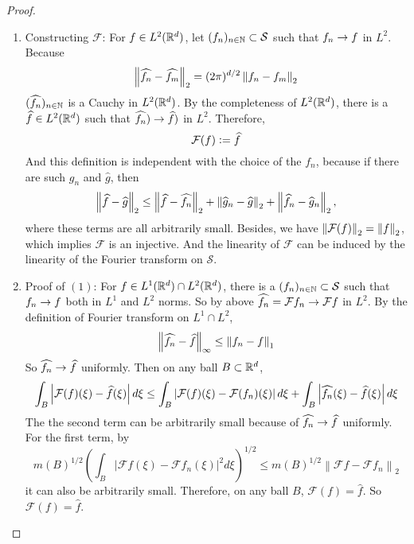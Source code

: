 \begin{enumerate}[label=\arabic*.]
\begin{proof}
\begin{enumerate}[label=\Roman*.]
			\item Constructing $\mathcal{F}$: For $f \in L^2(\mathbb{R}^d)$, let $(f_n)_{n \in \mathbb{N}} \subset \mathcal{S}$ such that $f_n \rightarrow f$ in $L^2$. Because
			\begin{equation*}
				\left\lVert\widehat{f_n} - \widehat{f_m}\right\lVert_2 = (2 \pi)^{d/2}\left\lVert{f_n} - {f_m}\right\lVert_2
			\end{equation*}
			$(\widehat{f_n})_{n \in \mathbb{N}}$ is a Cauchy in $L^2(\mathbb{R}^d)$. By the completeness of $L^2(\mathbb{R}^d)$, there is a $\widehat{f} \in L^2(\mathbb{R}^d)$ such that $\widehat{f_n}) \rightarrow \widehat{f})$ in $L^2$. Therefore, 
			\begin{equation*}
				\mathcal{F}(f) \vcentcolon= \widehat{f}
			\end{equation*}
			And this definition is independent with the choice of the $f_n$, because if there are such $g_n$ and $\widehat{g}$, then
			\begin{equation*}
				\left\lVert\widehat{f}-\widehat{g}\right\lVert_2 \leq \left\lVert\widehat{f}-\widehat{f_n}\right\lVert_2 + \left\lVert\widehat{g}_n-\widehat{g}\right\lVert_2+ \left\lVert\widehat{f}_n-\widehat{g}_n\right\lVert_2,
			\end{equation*}
			where these terms are all arbitrarily small. Besides, we have $\left\lVert\mathcal{F}(f)\right\lVert_2 = \left\lVert f\right\lVert_2$, which implies $\mathcal{F}$ is an injective. And the linearity of $\mathcal{F}$ can be induced by the linearity of the Fourier transform on $\mathcal{S}$.

			\item Proof of $(1)$: For $f \in L^1(\mathbb{R}^d) \cap L^2(\mathbb{R}^d)$, there is a $(f_n)_{n \in \mathbb{N}} \subset \mathcal{S}$ such that $f_n \rightarrow f$ both in $L^1$ and $L^2$ norms. So by above $\widehat{f_n} = \mathcal{F}f_n \rightarrow \mathcal{F}f$ in $L^2$. By the definition of Fourier transform on $L^1\cap L^2$,
			\begin{equation*}
				\left\lVert\widehat{f_n} - \widehat{f}\right\lVert_\infty \leq \left\lVert f_n-f\right\lVert_1
			\end{equation*}
			So $\widehat{f_n} \rightarrow \widehat{f}$ uniformly. Then on any ball $B \subset \mathbb{R}^d$,
			\begin{equation*}
				\int_B\left\lvert\mathcal{F}(f)(\xi) - \widehat{f}(\xi)\right\lvert d\xi \leq \int_B\left\lvert\mathcal{F}(f)(\xi) - \mathcal{F}(f_n)(\xi)\right\lvert d\xi + \int_B\left\lvert\widehat{f_n}(\xi) - \widehat{f}(\xi)\right\lvert d\xi
			\end{equation*}
			The the second term can be arbitrarily small because of $\widehat{f_n} \rightarrow \widehat{f}$ uniformly. For the first term, by
			\begin{equation*}
				m(B)^{1 / 2}\left(\int_B\left|\mathcal{F} f(\xi)-\mathcal{F} f_n(\xi)\right|^2 d \xi\right)^{1 / 2} \leq m(B)^{1 / 2}\left\|\mathcal{F} f-\mathcal{F} f_n\right\|_2
			\end{equation*}
			it can also be arbitrarily small. Therefore, on any ball $B$, $\mathcal{F}(f) = \widehat{f}$. So $\mathcal{F}(f) = \widehat{f}$.


\end{enumerate}
\end{proof}
\end{enumerate}
